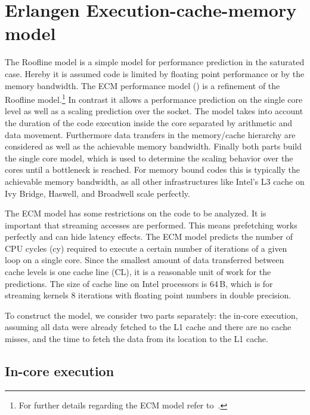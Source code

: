 \section{Erlangen Execution-cache-memory model}
\label{sec:ecm}

The Roofline model is a simple model
for performance prediction in the saturated case.
Hereby it is assumed code is limited by floating point performance or by the
memory bandwidth.
The ECM performance model (\cite{treibig-2010-ecm,hager-2012-ecm}) is a refinement
of the Roofline model.\footnote{For further details regarding the ECM model refer
to~\cite{stengel-2015}.}
In contrast it allows a performance prediction on the single core level as well
as a scaling prediction over the socket.
The model takes into account the duration of the code execution inside the core
separated by arithmetic and data movement.
Furthermore data transfers in the memory/cache hierarchy are considered as well
as the achievable memory bandwidth.
%
Finally both parts build the single core model, which is used to determine the
scaling behavior over the cores until a bottleneck is reached. 
%
For memory bound codes this is typically the achievable memory bandwidth,   as all
other infrastructures like Intel's L3 cache on Ivy Bridge, Haswell, and Broadwell
scale perfectly. 

The ECM model has some restrictions on the code to be analyzed.
It is important that streaming accesses are performed. This means prefetching
works perfectly and can hide latency effects.
The ECM model predicts the number of CPU cycles (cy) required to execute a certain number of iterations of a given loop on a single core. Since the smallest amount of data transferred between cache levels is one cache line (CL), it is a reasonable unit of work for the predictions. The size of cache line on Intel processors is 64\,B, which is for streaming kernels 8 iterations with floating point numbers in double precision.

To construct the model, we consider two parts separately: the in-core execution, assuming all data were already fetched to the L1 cache and there are no cache misses, and the time to fetch the data from its location to the L1 cache.

\subsection*{In-core execution}

